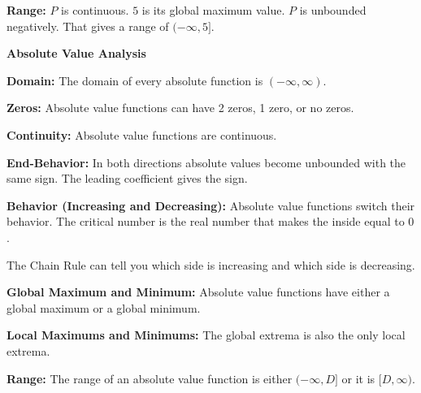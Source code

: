 \documentclass{ximera}
\begin{document}
\begin{example}
\textbf{Range:} $P$ is continuous.  $5$ is its global maximum value. $P$ is unbounded negatively.  That gives a range of $(-\infty, 5]$.


















\end{example}

















\begin{summary}\textbf{\textcolor{red!70!yellow}{Absolute Value Analysis}}


\textbf{Domain:} The domain of every absolute function is $(-\infty, \infty)$.

\textbf{Zeros:} Absolute value functions can have 2 zeros, 1 zero, or no zeros.

\textbf{Continuity:} Absolute value functions are continuous.

\textbf{End-Behavior:} In both directions absolute values become unbounded with the same sign.  The leading coefficient gives the sign.






\textbf{Behavior (Increasing and Decreasing):} Absolute value functions switch their behavior. The critical number is the real number that makes the inside equal to $0$.

The Chain Rule can tell you which side is increasing and which side is decreasing.

\textbf{Global Maximum and Minimum:}  Absolute value functions have either a global maximum or a global minimum.

\textbf{Local Maximums and Minimums:} The global extrema is also the only local extrema.

\textbf{Range:} The range of an absolute value function is either $(-\infty, D]$ or it is $[D, \infty)$.



\end{summary}
\end{document}
